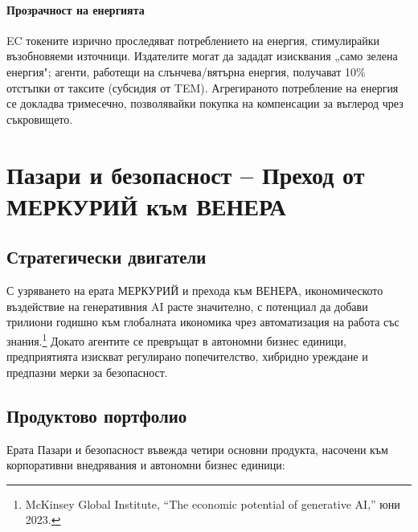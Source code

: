\documentclass[11pt]{article}
\begin{document}
\paragraph{Прозрачност на енергията} EC токените изрично проследяват потреблението на енергия, стимулирайки възобновяеми източници. Издателите могат да зададат изисквания „само зелена енергия"; агенти, работещи на слънчева/вятърна енергия, получават 10\% отстъпки от таксите (субсидия от TEM). Агрегираното потребление на енергия се докладва тримесечно, позволявайки покупка на компенсации за въглерод чрез съкровището.

\section{Пазари и безопасност -- Преход от МЕРКУРИЙ към ВЕНЕРА}
\subsection{Стратегически двигатели}
С узряването на ерата МЕРКУРИЙ и прехода към ВЕНЕРА, икономическото въздействие на генеративния AI расте значително, с потенциал да добави трилиони годишно към глобалната икономика чрез автоматизация на работа със знания.\footnote{McKinsey Global Institute, ``The economic potential of generative AI,'' юни 2023.} Докато агентите се превръщат в автономни бизнес единици, предприятията изискват регулирано попечителство, хибридно уреждане и предпазни мерки за безопасност.

\subsection{Продуктово портфолио}
Ерата Пазари и безопасност въвежда четири основни продукта, насочени към корпоративни внедрявания и автономни бизнес единици:
\end{document}

